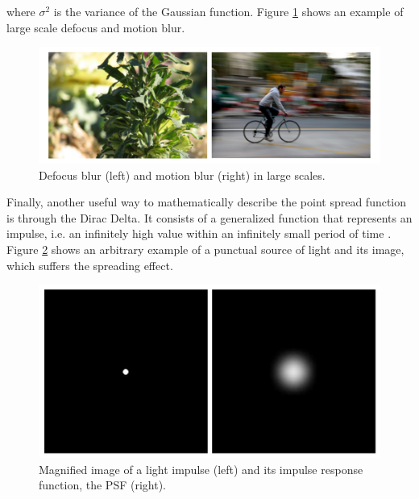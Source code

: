 \noindent where $\sigma^{2}$ is the variance of the Gaussian function. Figure \ref{fig:defocus_motion_blur} shows an example of large scale defocus and motion blur.

\begin{figure}[H]
	\centering
	\caption{\label{fig:defocus_motion_blur}Defocus blur (left) and motion blur (right) in large scales.}
	\begin{center}
	    \includegraphics[scale=0.4]{images/fig7.png}
	\end{center}
	\centering
\end{figure}

Finally, another useful way to mathematically describe the point spread function is through the Dirac Delta. It consists of a generalized function that represents an impulse, i.e. an infinitely high value within an infinitely small period of time \cite{bracewell2000fourier}. Figure \ref{fig:psf} shows an arbitrary example of a punctual source of light and its image, which suffers the spreading effect.

\begin{figure}[H]
	\centering
	\caption{\label{fig:psf} Magnified image of a light impulse (left) and its impulse response function, the PSF (right).}
	\begin{center}
	    \includegraphics[scale=0.4]{images/fig8.png}
	\end{center}
	\centering
\end{figure}

